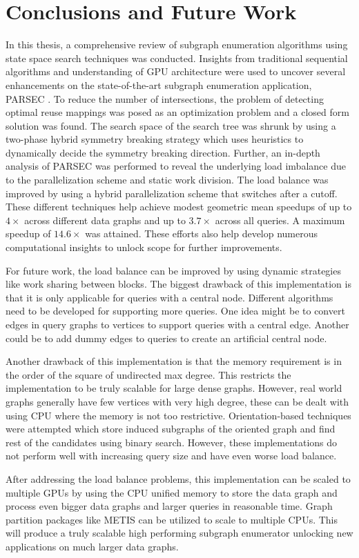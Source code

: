 \chapter{Conclusions and Future Work}\label{chap:conclusions}

In this thesis, a comprehensive review of subgraph enumeration algorithms using state space search techniques was conducted.
Insights from traditional sequential algorithms and understanding of GPU architecture were used to uncover several enhancements on the state-of-the-art subgraph enumeration application, PARSEC \cite{PARSEC_VD}.
To reduce the number of intersections, the problem of detecting optimal reuse mappings was posed as an optimization problem and a closed form solution was found.
The search space of the search tree was shrunk by using a two-phase hybrid symmetry breaking strategy which uses heuristics to dynamically decide the symmetry breaking direction.
Further, an in-depth analysis of PARSEC \cite{PARSEC_VD} was performed to reveal the underlying load imbalance due to the parallelization scheme and static work division.
The load balance was improved by using a hybrid parallelization scheme that switches after a cutoff.
These different techniques help achieve modest geometric mean speedups of up to $4\times$ across different data graphs and up to $3.7\times$ across all queries. A maximum speedup of $14.6\times$ was attained.
These efforts also help develop numerous computational insights to unlock scope for further improvements.

For future work, the load balance can be improved by using dynamic strategies like work sharing between blocks.
The biggest drawback of this implementation is that it is only applicable for queries with a central node.
Different algorithms need to be developed for supporting more queries.
One idea might be to convert edges in query graphs to vertices to support queries with a central edge.
Another could be to add dummy edges to queries to create an artificial central node.

Another drawback of this implementation is that the memory requirement is in the order of the square of undirected max degree. This restricts the implementation to be truly scalable for large dense graphs. However, real world graphs generally have few vertices with very high degree, these can be dealt with using CPU where the memory is not too restrictive.
Orientation-based techniques were attempted which store induced subgraphs of the oriented graph and find rest of the candidates using binary search.
However, these implementations do not perform well with increasing query size and have even worse load balance.

After addressing the load balance problems, this implementation can be scaled to multiple GPUs by using the CPU unified memory to store the data graph and process even bigger data graphs and larger queries in reasonable time.
Graph partition packages like METIS \cite{metis} can be utilized to scale to multiple CPUs.
This will produce a truly scalable high performing subgraph enumerator unlocking new applications on much larger data graphs.
